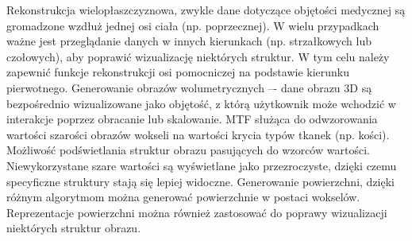 Rekonstrukcja wielopłaszczyznowa, zwykle dane dotyczące objętości medycznej są gromadzone wzdłuż jednej osi ciała (np. poprzecznej).
W wielu przypadkach ważne jest przeglądanie danych w innych kierunkach (np. strzałkowych lub czołowych), aby poprawić wizualizację niektórych struktur.
W tym celu należy zapewnić funkcje rekonstrukcji osi pomocniczej na podstawie kierunku pierwotnego.
Generowanie obrazów wolumetrycznych –- dane obrazu 3D są bezpośrednio wizualizowane jako objętość, z którą użytkownik może wchodzić w interakcje poprzez obracanie lub skalowanie.
MTF  służąca do odwzorowania wartości szarości obrazów wokseli na wartości krycia typów tkanek (np. kości).
Możliwość podświetlania struktur obrazu pasujących do wzorców wartości.
Niewykorzystane szare wartości są wyświetlane jako przezroczyste, dzięki czemu specyficzne struktury stają się lepiej widoczne.
Generowanie powierzchni, dzięki różnym algorytmom można generować powierzchnie w postaci wokselów. Reprezentacje powierzchni można również zastosować do poprawy wizualizacji niektórych struktur obrazu.